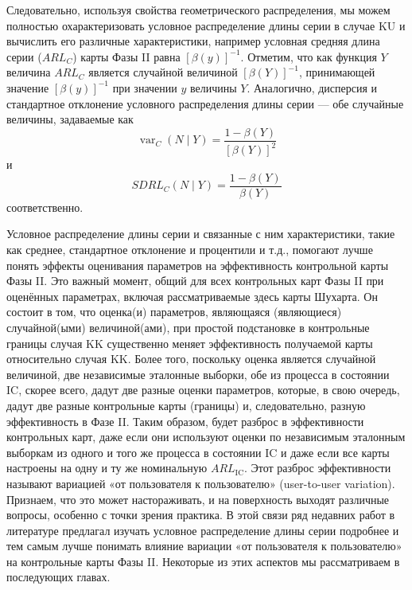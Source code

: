 Следовательно, используя свойства геометрического распределения, мы можем полностью охарактеризовать условное распределение длины серии в случае KU и вычислить его различные характеристики, например условная средняя длина серии (\(ARL_C\)) карты Фазы II равна \([\beta(y)]^{-1}\). Отметим, что как функция \(Y\) величина \(ARL_C\) является случайной величиной \([\beta(Y)]^{-1}\), принимающей значение \([\beta(y)]^{-1}\) при значении \(y\) величины \(Y\). Аналогично, дисперсия и стандартное отклонение условного распределения длины серии — обе случайные величины, задаваемые как
\[
	\operatorname{var}_C(N \mid Y) = \frac{1 - \beta(Y)}{[\beta(Y)]^2}
\]
и
\[
	SDRL_C(N \mid Y) = \frac{1 - \beta(Y)}{\beta(Y)}
\]
соответственно.

Условное распределение длины серии и связанные с ним характеристики, такие как среднее, стандартное отклонение и процентили и т.д., помогают лучше понять эффекты оценивания параметров на эффективность контрольной карты Фазы II. Это важный момент, общий для всех контрольных карт Фазы II при оценённых параметрах, включая рассматриваемые здесь карты Шухарта. Он состоит в том, что оценка(и) параметров, являющаяся (являющиеся) случайной(ыми) величиной(ами), при простой подстановке в контрольные границы случая KK существенно меняет эффективность получаемой карты относительно случая KK. Более того, поскольку оценка является случайной величиной, две независимые эталонные выборки, обе из процесса в состоянии IC, скорее всего, дадут две разные оценки параметров, которые, в свою очередь, дадут две разные контрольные карты (границы) и, следовательно, разную эффективность в Фазе II. Таким образом, будет разброс в эффективности контрольных карт, даже если они используют оценки по независимым эталонным выборкам из одного и того же процесса в состоянии IC и даже если все карты настроены на одну и ту же номинальную \(ARL_{\text{IC}}\). Этот разброс эффективности называют вариацией «от пользователя к пользователю» (user-to-user variation). Признаем, что это может настораживать, и на поверхность выходят различные вопросы, особенно с точки зрения практика. В этой связи ряд недавних работ в литературе предлагал изучать условное распределение длины серии подробнее и тем самым лучше понимать влияние вариации «от пользователя к пользователю» на контрольные карты Фазы II. Некоторые из этих аспектов мы рассматриваем в последующих главах.

